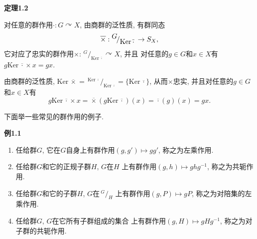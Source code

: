 \documentclass[UTF8]{ctexart}
\begin{document}
\vspace{10pt}

\hypertarget{sec:定理1.2}{}
\noindent\textbf{定理1.2}

对任意的群作用$\cdot:G\curvearrowright X$, 由商群的泛性质, 有群同态
\vspace{3pt}
\[
    \overline{\times}:\,\!^{\displaystyle G}\!
    /_{\displaystyle\mathrm{Ker}\,\overline{\cdot}}\,\to S_X,\\[3pt]
\]
它对应了忠实的群作用$\times:\,\!^{\displaystyle G}\!
/_{\displaystyle\mathrm{Ker}\,\overline{\cdot}}\curvearrowright X$, 并且
对任意的$g\in G$和$x\in X$有$g\mathrm{Ker}\,\overline{\cdot}\times x=gx$.

\vspace{3pt}

由商群的泛性质, $\mathrm{Ker}\,\overline{\times}=
\,\!^{\displaystyle\mathrm{Ker}\,\overline{\cdot}}\!/_
{\displaystyle\mathrm{Ker}\,\overline{\cdot}}=\{\mathrm{Ker}\,\overline{\cdot}\}$,
从而$\times$忠实, 并且对任意的$g\in G$和$x\in X$有
\vspace{5pt}
\begin{equation*}
    g\mathrm{Ker}\,\overline{\cdot}\times x=
    \overline{\times}(g\mathrm{Ker}\,\overline{\cdot})(x)=
    \overline{\cdot}(g)(x)=gx.
\tag*{\qedsymbol}\end{equation*}

\vspace{15pt}

下面举一些常见的群作用的例子.

\vspace{10pt}

\hypertarget{sec:例1.1}{}
\noindent\textbf{例1.1}

\begin{enumerate}
    \item 任给群$G$, 它在$G$自身上有群作用$(g,g')\mapsto gg'$, 称之为左乘作用.
    \item 任给群$G$和它的正规子群$H$, $G$在$H$
    上有群作用$(g,h)\mapsto ghg^{-1}$, 称之为共轭作用.
    \vspace{3pt}
    \item 任给群$G$和它的子群$H$, $G$在$\,\!^{\displaystyle G}\!/_{\displaystyle H}$
    上有群作用$(g,P)\mapsto gP$, 称之为对陪集的左乘作用.
    \vspace{3pt}
    \item 任给群$G$, $G$在它所有子群组成的集合
    上有群作用$(g,H)\mapsto gHg^{-1}$, 称之为对子群的共轭作用.
\end{enumerate}
\end{document}
